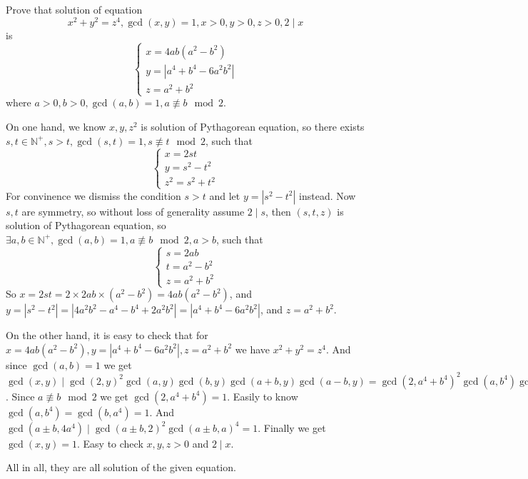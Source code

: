 \documentclass{ctexart}
\newif\ifpreface
\begin{document}
\large
\iffalse
  \setlength{\baselineskip}{1.2em}
  \ifpreface
    
  \else
    \maketitle
  \fi
\fi
{}
\begin{problem}\label{pro:p26.3}
  Prove that solution of equation
  \[
    x^2 + y^2 = z^4,\gcd(x,y)=1,x>0,y>0,z>0,2 \mid x
  \]
  is
  \[
    \begin{cases}
      x=4ab(a^2-b^2)      \\
      y=|a^4+b^4-6a^2b^2| \\
      z=a^2 + b^2
    \end{cases}
  \]
  where \(a>0,b>0,\gcd(a,b)=1,a \not \equiv b \mod 2\).
\end{problem}
\begin{solution}
  On one hand,
  we know \(x,y,z^2\) is solution of Pythagorean equation, so there exists \(s,t \in \mathbb{N}^+,s>t,\gcd(s,t)=1,s \not \equiv t \mod 2\), such that
  \[
    \begin{cases}
      x=2st     \\
      y=s^2-t^2 \\
      z^2=s^2+t^2
    \end{cases}
  \]
  For convinence we dismiss the condition \(s>t\) and let \(y=|s^2-t^2|\) instead.
  Now \(s,t\) are symmetry, so without loss of generality assume \(2 \mid s\), then \((s,t,z)\) is solution of Pythagorean equation, so \(\exists a,b \in \mathbb{N}^+,\gcd(a,b)=1,a \not\equiv b \mod 2,a>b\), such that
  \[
    \begin{cases}
      s=2ab     \\
      t=a^2-b^2 \\
      z=a^2 + b^2
    \end{cases}
  \]
  So \(x=2st=2 \times 2ab \times (a^2-b^2)=4ab(a^2-b^2)\), and \(y=|s^2-t^2|=|4a^2b^2-a^4-b^4+2a^2b^2|=|a^4+b^4-6a^2b^2|\), and \(z=a^2+b^2\).

  On the other hand, it is easy to check that for \(x=4ab(a^2-b^2),    y=|a^4+b^4-6a^2b^2|,    z=a^2 + b^2\) we have \(x^2 + y^2 = z^4\).
  And since \(\gcd(a,b)=1\) we get \(\gcd(x,y)\mid \gcd(2,y)^2 \gcd(a,y) \gcd(b,y)\gcd(a+b,y) \gcd(a-b,y)=\gcd(2,a^4+b^4)^2 \gcd(a,b^4)\gcd(b,a^4) \gcd(a+b,4a^4)\gcd(a-b,4a^4)\).
  Since \(a \not \equiv b \mod 2\) we get \(\gcd(2,a^4+b^4)=1\).
  Easily to know \(\gcd(a,b^4)=\gcd(b,a^4)=1\).
  And \(\gcd(a \pm b,4a^4) \mid \gcd(a \pm b,2)^2 \gcd(a \pm b,a)^4=1\).
  Finally we get \(\gcd(x,y)=1\).
  Easy to check \(x,y,z>0\) and \(2 \mid x\).

  All in all, they are all solution of the given equation.
\end{solution}
\end{document}
